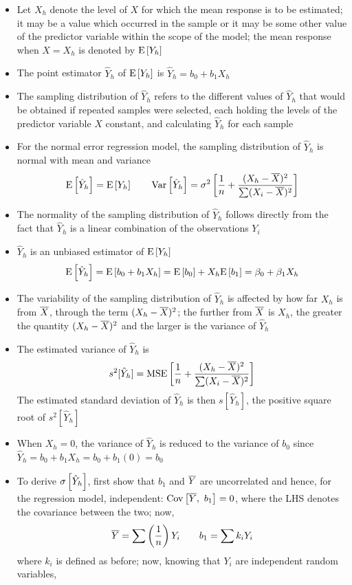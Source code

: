\begin{itemize}
\item Let $X_h$ denote the level of $X$ for which the mean response is to be estimated; it may be a value which occurred in the sample or it may be some other value of the predictor variable within the scope of the model; the mean response when $X=X_h$ is denoted by $\mathrm{E}\left[ Y_h \right]$ 
\item The point estimator $\hat{Y}_h$ of $\mathrm{E}\left[ Y_h \right]$ is $\hat{Y}_h = b_0 + b_1X_h$
\item The sampling distribution of $\hat{Y}_h$ refers to the different values of $\hat{Y}_h$ that would be obtained if repeated samples were selected, each holding the levels of the predictor variable $X$ constant, and calculating $\hat{Y}_h$ for each sample
\item For the normal error regression model, the sampling distribution of $\hat{Y}_h$ is normal with mean and variance $$ \mathrm{E}\left[ \hat{Y}_h \right] = \mathrm{E}\left[ Y_h \right] ~~~~~~ \mathrm{Var}\left[ \hat{Y}_h \right] = \sigma^2\left[ \frac{1}{n} + \frac{(X_h - \overline{X})^2}{\sum (X_i - \overline{X})^2}\right] $$ 
\item The normality of the sampling distribution of $\hat{Y}_h$ follows directly from the fact that $\hat{Y}_h$ is a linear combination of the observations $Y_i$
\item $\hat{Y}_h$ is an unbiased estimator of $\mathrm{E}\left[ Y_h \right]$ $$ \mathrm{E}\left[ \hat{Y}_h \right] = \mathrm{E}\left[ b_0 + b_1X_h \right] = \mathrm{E}\left[ b_0 \right] + X_h\mathrm{E}\left[ b_1 \right] = \beta_0 + \beta_1X_h $$ 
\item The variability of the sampling distribution of $\hat{Y}_h$ is affected by how far $X_h$ is from $\overline{X}$, through the term $(X_h - \overline{X})^2$; the further from $\overline{X}$ is $X_h$, the greater the quantity $(X_h - \overline{X})^2$ and the larger is the variance of $\hat{Y}_h$
\item The estimated variance of $\hat{Y}_h$ is $$ s^2[\hat{Y}_h] = \text{MSE}\left[ \frac{1}{n} + \frac{(X_h - \overline{X})^2}{\sum (X_i - \overline{X})^2} \right] $$ The estimated standard deviation of $\hat{Y}_h$ is then $s[\hat{Y}_h]$, the positive square root of $s^2[\hat{Y}_h]$
\item When $X_h = 0$, the variance of $\hat{Y}_h$ is reduced to the variance of $b_0$ since $\hat{Y}_h = b_0 + b_1X_h = b_0 + b_1(0) = b_0$
\item To derive $\sigma \left[ \hat{Y}_h \right]$, first show that $b_1$ and $\overline{Y}$ are uncorrelated and hence, for the regression model, independent: $\mathrm{Cov}\left[ \overline{Y},~b_1\right] = 0$, where the LHS denotes the covariance between the two; now, $$ \overline{Y} = \sum \left( \frac{1}{n} \right)Y_i ~~~~~~ b_1 = \sum k_iY_i $$ where $k_i$ is defined as before; now, knowing that $Y_i$ are independent random variables, 

\end{itemize}
